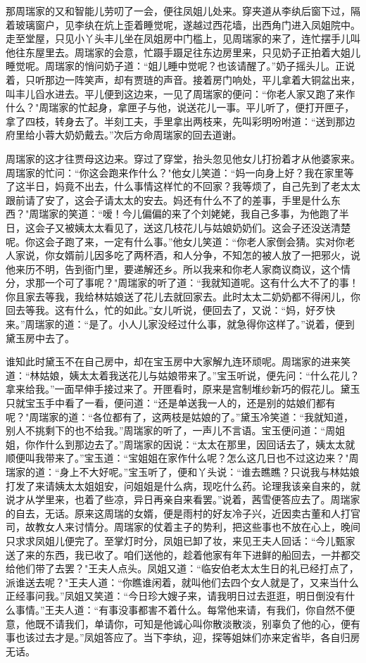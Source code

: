那周瑞家的又和智能儿劳叨了一会，便往凤姐儿处来。穿夹道从李纨后窗下过，隔着玻璃窗户，见李纨在炕上歪着睡觉呢，遂越过西花墙，出西角门进入凤姐院中。走至堂屋，只见小丫头丰儿坐在凤姐房中门槛上，见周瑞家的来了，连忙摆手儿叫他往东屋里去。周瑞家的会意，忙蹑手蹑足往东边房里来，只见奶子正拍着大姐儿睡觉呢。周瑞家的悄问奶子道：“姐儿睡中觉呢？也该请醒了。”奶子摇头儿。正说着，只听那边一阵笑声，却有贾琏的声音。接着房门响处，平儿拿着大铜盆出来，叫丰儿舀水进去。平儿便到这边来，一见了周瑞家的便问：“你老人家又跑了来作什么？"周瑞家的忙起身，拿匣子与他，说送花儿一事。平儿听了，便打开匣子，拿了四枝，转身去了。半刻工夫，手里拿出两枝来，先叫彩明吩咐道：“送到那边府里给小蓉大奶奶戴去。”次后方命周瑞家的回去道谢。

周瑞家的这才往贾母这边来。穿过了穿堂，抬头忽见他女儿打扮着才从他婆家来。周瑞家的忙问：“你这会跑来作什么？"他女儿笑道：“妈一向身上好？我在家里等了这半日，妈竟不出去，什么事情这样忙的不回家？我等烦了，自己先到了老太太跟前请了安了，这会子请太太的安去。妈还有什么不了的差事，手里是什么东西？"周瑞家的笑道：“嗳！今儿偏偏的来了个刘姥姥，我自己多事，为他跑了半日，这会子又被姨太太看见了，送这几枝花儿与姑娘奶奶们。这会子还没送清楚呢。你这会子跑了来，一定有什么事。”他女儿笑道：“你老人家倒会猜。实对你老人家说，你女婿前儿因多吃了两杯酒，和人分争，不知怎的被人放了一把邪火，说他来历不明，告到衙门里，要递解还乡。所以我来和你老人家商议商议，这个情分，求那一个可了事呢？"周瑞家的听了道：“我就知道呢。这有什么大不了的事！你且家去等我，我给林姑娘送了花儿去就回家去。此时太太二奶奶都不得闲儿，你回去等我。这有什么，忙的如此。”女儿听说，便回去了，又说：“妈，好歹快来。”周瑞家的道：“是了。小人儿家没经过什么事，就急得你这样了。”说着，便到黛玉房中去了。

谁知此时黛玉不在自己房中，却在宝玉房中大家解九连环顽呢。周瑞家的进来笑道：“林姑娘，姨太太着我送花儿与姑娘带来了。”宝玉听说，便先问：“什么花儿？拿来给我。”一面早伸手接过来了。开匣看时，原来是宫制堆纱新巧的假花儿。黛玉只就宝玉手中看了一看，便问道：“还是单送我一人的，还是别的姑娘们都有呢？"周瑞家的道：“各位都有了，这两枝是姑娘的了。”黛玉冷笑道：“我就知道，别人不挑剩下的也不给我。”周瑞家的听了，一声儿不言语。宝玉便问道：“周姐姐，你作什么到那边去了。”周瑞家的因说：“太太在那里，因回话去了，姨太太就顺便叫我带来了。”宝玉道：“宝姐姐在家作什么呢？怎么这几日也不过这边来？"周瑞家的道：“身上不大好呢。”宝玉听了，便和丫头说：“谁去瞧瞧？只说我与林姑娘打发了来请姨太太姐姐安，问姐姐是什么病，现吃什么药。论理我该亲自来的，就说才从学里来，也着了些凉，异日再亲自来看罢。”说着，茜雪便答应去了。周瑞家的自去，无话。原来这周瑞的女婿，便是雨村的好友冷子兴，近因卖古董和人打官司，故教女人来讨情分。周瑞家的仗着主子的势利，把这些事也不放在心上，晚间只求求凤姐儿便完了。至掌灯时分，凤姐已卸了妆，来见王夫人回话：“今儿甄家送了来的东西，我已收了。咱们送他的，趁着他家有年下进鲜的船回去，一并都交给他们带了去罢？"王夫人点头。凤姐又道：“临安伯老太太生日的礼已经打点了，派谁送去呢？"王夫人道：“你瞧谁闲着，就叫他们去四个女人就是了，又来当什么正经事问我。”凤姐又笑道：“今日珍大嫂子来，请我明日过去逛逛，明日倒没有什么事情。”王夫人道：“有事没事都害不着什么。每常他来请，有我们，你自然不便意，他既不请我们，单请你，可知是他诚心叫你散淡散淡，别辜负了他的心，便有事也该过去才是。”凤姐答应了。当下李纨，迎，探等姐妹们亦来定省毕，各自归房无话。

